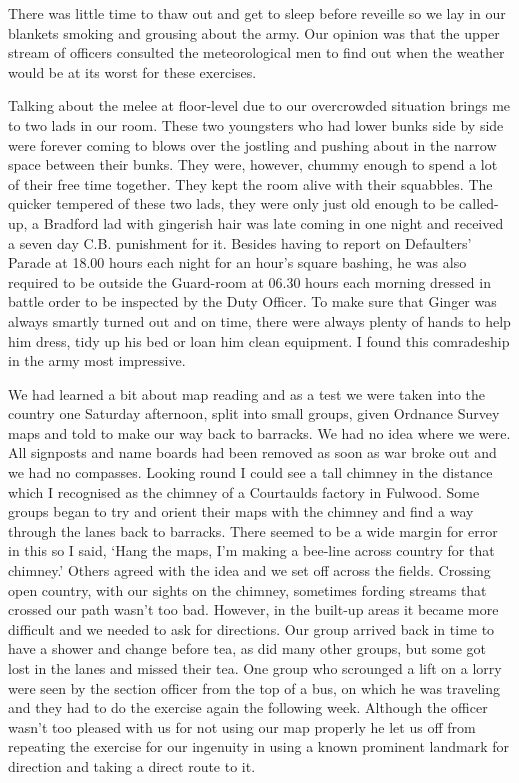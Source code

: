 There was little time to thaw out and get to sleep before reveille so
we lay in our blankets smoking and grousing about the army. Our
opinion was that the upper stream of officers consulted the
meteorological men to find out when the weather would be at its worst
for these exercises. 

Talking about the melee at floor-level due to our overcrowded
situation brings me to two lads in our room. These two youngsters who
had lower bunks side by side were forever coming to blows over the
jostling and pushing about in the narrow space between their bunks.
They were, however, chummy enough to spend a lot of their free time
together. They kept the room alive with their squabbles. The quicker
tempered of these two lads, they were only just old enough to be
called-up, a Bradford lad with gingerish hair was late coming in one
night and received a seven day C.B. punishment for it. Besides having
to report on Defaulters' Parade at 18.00 hours each night for an
hour's square bashing, he was also required to be outside the
Guard-room at 06.30 hours each morning dressed in battle order to be
inspected by the Duty Officer. To make sure that Ginger was always
smartly turned out and on time, there were always plenty of hands to
help him dress, tidy up his bed or loan him clean equipment. I found
this comradeship in the army most impressive. 

We had learned a bit about map reading and as a test we were taken
into the country one Saturday afternoon, split into small groups,
given Ordnance Survey maps and told to make our way back to barracks.
We had no idea where we were. All signposts and name boards had been
removed as soon as war broke out and we had no compasses. Looking
round I could see a tall chimney in the distance which I recognised as
the chimney of a Courtaulds factory in Fulwood. Some groups began to
try and orient their maps with the chimney and find a way through the
lanes back to barracks. There seemed to be a wide margin for error in
this so I said, `Hang the maps, I'm making a bee-line across country
for that chimney.' Others agreed with the idea and we set off across
the fields. Crossing open country, with our sights on the chimney,
sometimes fording streams that crossed our path wasn't too bad.
However, in the built-up areas it became more difficult and we needed
to ask for directions. Our group arrived back in time to have a
shower and change before tea, as did many other groups, but some got
lost in the lanes and missed their tea. One group who scrounged a
lift on a lorry were seen by the section officer from the top of a
bus, on which he was traveling and they had to do the exercise again
the following week. Although the officer wasn't too pleased with us
for not using our map properly he let us off from repeating the
exercise for our ingenuity in using a known prominent landmark for
direction and taking a direct route to it. 

